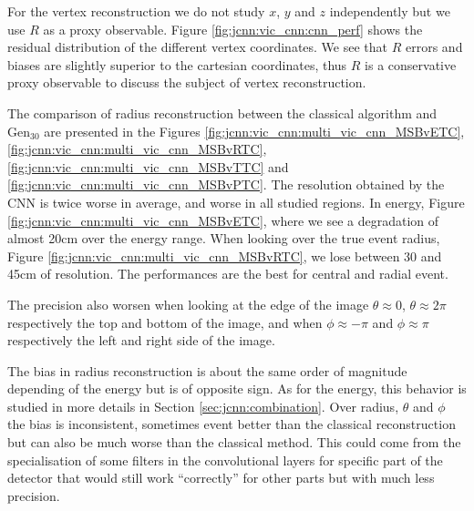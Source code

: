 \documentclass[../main.tex]{subfiles}
\begin{document}
{{For the vertex reconstruction we do not study $x$, $y$ and $z$ independently but we use $R$ as a proxy observable. Figure \ref{fig:jcnn:vic_cnn:cnn_perf} shows the residual distribution of the different vertex coordinates. We see that $R$ errors and biases are slightly superior to the cartesian coordinates, thus $R$ is a conservative proxy observable to discuss the subject of vertex reconstruction.

The comparison of radius reconstruction between the classical algorithm and $\mathrm{Gen}_{30}$ are presented in the Figures \ref{fig:jcnn:vic_cnn:multi_vic_cnn_MSBvETC}, \ref{fig:jcnn:vic_cnn:multi_vic_cnn_MSBvRTC}, \ref{fig:jcnn:vic_cnn:multi_vic_cnn_MSBvTTC} and \ref{fig:jcnn:vic_cnn:multi_vic_cnn_MSBvPTC}. The resolution obtained by the CNN is twice worse in average, and worse in all studied regions.
In energy, Figure \ref{fig:jcnn:vic_cnn:multi_vic_cnn_MSBvETC}, where we see a degradation of almost 20cm over the energy range.
When looking over the true event radius, Figure \ref{fig:jcnn:vic_cnn:multi_vic_cnn_MSBvRTC}, we lose between 30 and 45cm of resolution. The performances are the best for central and radial event.

The precision also worsen when looking at the edge of the image $\theta \approx 0$, $\theta \approx 2\pi$ respectively the top and bottom of the image, and when $\phi \approx -\pi$ and $\phi \approx \pi$ respectively the left and right side of the image.

The bias in radius reconstruction is about the same order of magnitude depending of the energy but is of opposite sign. As for the energy, this behavior is studied in more details in Section \ref{sec:jcnn:combination}. Over radius, $\theta$ and $\phi$ the bias is inconsistent, sometimes event better than the classical reconstruction but can also be much worse than the classical method. This could come from the specialisation of some filters in the convolutional layers for specific part of the detector that would still work ``correctly'' for other parts but with much less precision.

}}
\end{document}
